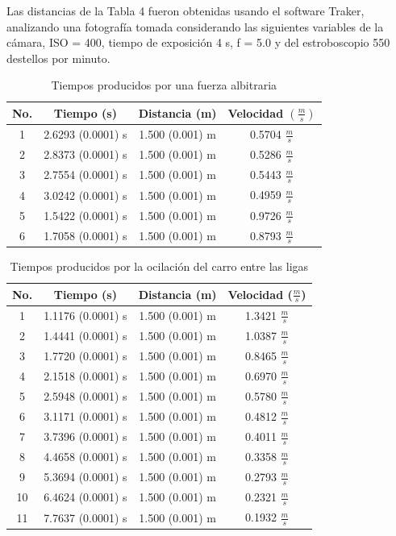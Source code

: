 \documentclass[12pt,a4paper]{article}
\begin{document}
Las distancias de la Tabla 4 fueron obtenidas usando el software Traker, analizando una fotografía tomada considerando las siguientes variables de la cámara, ISO = 400, tiempo de exposición 4 s, f = 5.0 y del estroboscopio 550 destellos por minuto.

\begin{table}[h!]
\begin{center}
\begin{tabular}{|c|c|c|c|}
\hline
No. & Tiempo (s) & Distancia (m) & Velocidad $(\frac{m}{s})$\\
\hline
1 & 2.6293 (0.0001) s & 1.500 (0.001) m & 0.5704 $\frac{m}{s}$\\
\hline
2 &  2.8373 (0.0001) s & 1.500 (0.001) m & 0.5286 $\frac{m}{s}$\\
\hline
3 & 2.7554 (0.0001) s & 1.500 (0.001) m &0.5443 $\frac{m}{s}$\\
\hline
4 & 3.0242 (0.0001) s & 1.500 (0.001) m &0.4959 $\frac{m}{s}$\\
\hline
5 & 1.5422 (0.0001) s & 1.500 (0.001) m &0.9726 $\frac{m}{s}$\\
\hline
6 & 1.7058 (0.0001) s & 1.500 (0.001) m &0.8793 $\frac{m}{s}$ \\
\hline
\end{tabular}
\caption{Tiempos producidos por una fuerza albitraria}
\end{center}
\end{table}

\begin{table}[h!]
\begin{center}
\begin{tabular}{|c|c|c|c|}
\hline
No. & Tiempo (s) & Distancia (m) & Velocidad ($\frac{m}{s}$)\\
\hline
1 & 1.1176 (0.0001) s & 1.500 (0.001) m & 1.3421 $\frac{m}{s}$ \\ \hline 
2 & 1.4441 (0.0001) s & 1.500 (0.001) m & 1.0387 $\frac{m}{s}$ \\ \hline  
3 & 1.7720 (0.0001) s & 1.500 (0.001) m & 0.8465 $\frac{m}{s}$ \\ \hline  
4 & 2.1518 (0.0001) s & 1.500 (0.001) m & 0.6970 $\frac{m}{s}$ \\ \hline 
5 & 2.5948 (0.0001) s & 1.500 (0.001) m & 0.5780 $\frac{m}{s}$ \\ \hline
6 & 3.1171 (0.0001) s & 1.500 (0.001) m & 0.4812 $\frac{m}{s}$ \\ \hline  
7 & 3.7396 (0.0001) s & 1.500 (0.001) m & 0.4011 $\frac{m}{s}$ \\ \hline 
8 & 4.4658 (0.0001) s & 1.500 (0.001) m & 0.3358 $\frac{m}{s}$ \\ \hline
9 & 5.3694 (0.0001) s & 1.500 (0.001) m & 0.2793 $\frac{m}{s}$ \\ \hline 
10 & 6.4624 (0.0001) s & 1.500 (0.001) m & 0.2321 $\frac{m}{s}$ \\ \hline 
11 & 7.7637 (0.0001) s & 1.500 (0.001) m & 0.1932 $\frac{m}{s}$ \\ \hline 
\end{tabular}
\caption{Tiempos producidos por la ocilación del carro entre las ligas}
\end{center}
\end{table}
\end{document}
